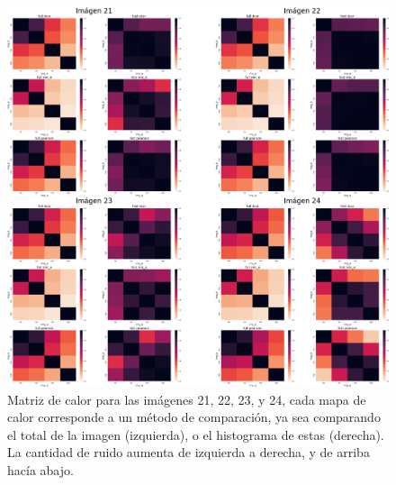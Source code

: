 \begin{figure}
    \centering
    \includegraphics[width=\textwidth]{figuras/heatmaps/heatmaps_app_5.png}
    \caption{Matriz de calor para las im\'agenes 21, 22, 23, y 24, cada mapa de calor corresponde a un m\'etodo de comparaci\'on, ya sea comparando el total de la imagen (izquierda), o el histograma de estas (derecha). La cantidad de ruido aumenta de izquierda a derecha, y de arriba hacía abajo.}
\end{figure}



